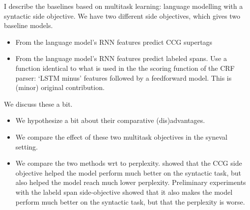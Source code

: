 I describe the baselines based on multitask learning: language modelling with a syntactic side objective. We have two different side objectives, which gives two baseline models.
\begin{itemize}
  \item From the language model's RNN features predict CCG supertags  \citep{Enguehard+2017:RNN-multitask}
  \item From the language model's RNN features predict labeled spans. Use a function identical to what is used in the the scoring function of the CRF parser: `LSTM minus' features followed by a feedforward model. This is (minor) original contribution.
\end{itemize}

We discuss these a bit.
\begin{itemize}
  \item We hypothesize a bit about their comparative (dis)advantages.
  \item We compare the effect of these two multitask objectives in the syneval setting.
  \item We compare the two methods wrt to perplexity. \cite{Enguehard+2017:RNN-multitask} showed that the CCG side objective helped the model perform much better on the syntactic task, but also helped the model reach much lower perplexity. Preliminary experiments with the labeld span side-objective showed that it also makes the model perform much better on the syntactic task, but that the perplexity is worse.
\end{itemize}

